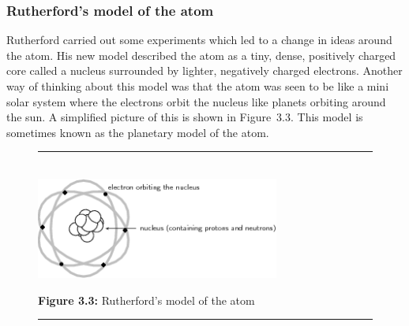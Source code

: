             \subsubsection{ Rutherford's model of the atom}
            \nopagebreak
            \label{m38756*id254751}Rutherford carried out some experiments which led to a change in ideas around the atom. His new model described the atom as a tiny, dense, positively charged core called a nucleus surrounded by lighter, negatively charged electrons. Another way of thinking about this model was that the atom was seen to be like a mini solar system where the electrons orbit the nucleus like planets orbiting around the sun. A simplified picture of this is shown in Figure~3.3. This model is sometimes known as the planetary model of the atom.\par 
    \setcounter{subfigure}{0}
	\begin{figure}[H] %
    \begin{center}
    \rule[.1in]{\figurerulewidth}{.005in} \\
        \label{m38756*uid5!!!underscore!!!media}\label{m38756*uid5!!!underscore!!!printimage}\includegraphics[width=8cm]{col11305.imgs/m38756_CG10C3_003.png} %
      \vspace{2pt}
    \vspace{\rubberspace}\par \begin{cnxcaption}
	  \small \textbf{Figure 3.3: }Rutherford's model of the atom
	\end{cnxcaption}
    \vspace{.1in}
    \rule[.1in]{\figurerulewidth}{.005in} \\
    \end{center}
 \end{figure}       
      \label{m38756*uid6}
